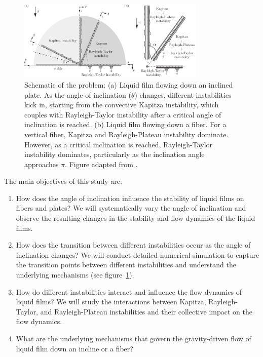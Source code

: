 \documentclass[11pt]{article}
\begin{document}
\begin{figure}[H]
	\begin{center}
		\includegraphics[width=0.8\textwidth]{schematic_dropsOnFibers.pdf}
		\caption{Schematic of the problem: (a) Liquid film flowing down an inclined plate. As the angle of inclination ($\theta$) changes, different instabilities kick in, starting from the convective Kapitza instability, which couples with Rayleigh-Taylor instability after a critical angle of inclination is reached. (b) Liquid film flowing down a fiber. For a vertical fiber, Kapitza and Rayleigh-Plateau instability dominate. However,  as a critical inclination is reached, Rayleigh-Taylor instability dominates, particularly as the inclination angle approaches $\pi$. Figure adapted from \citet{rietz2017dynamics}.}
		\label{Figure::Typical}
\end{center}
\end{figure}

\noindent The main objectives of this study are:

\begin{enumerate}
	\item How does the angle of inclination influence the stability of liquid films on fibers and plates? We will systematically vary the angle of inclination and observe the resulting changes in the stability and flow dynamics of the liquid films.
	
	\item How does the transition between different instabilities occur as the angle of inclination changes? We will conduct detailed numerical simulation to capture the transition points between different instabilities and understand the underlying mechanisms (see figure~\ref{Figure::Typical}). 
	
	\item How do different instabilities interact and influence the flow dynamics of liquid films? We will study the interactions between Kapitza, Rayleigh-Taylor, and Rayleigh-Plateau instabilities and their collective impact on the flow dynamics.
	
	\item What are the underlying mechanisms that govern the gravity-driven flow of liquid film down an incline or a fiber?
		
\end{enumerate}
\end{document}
